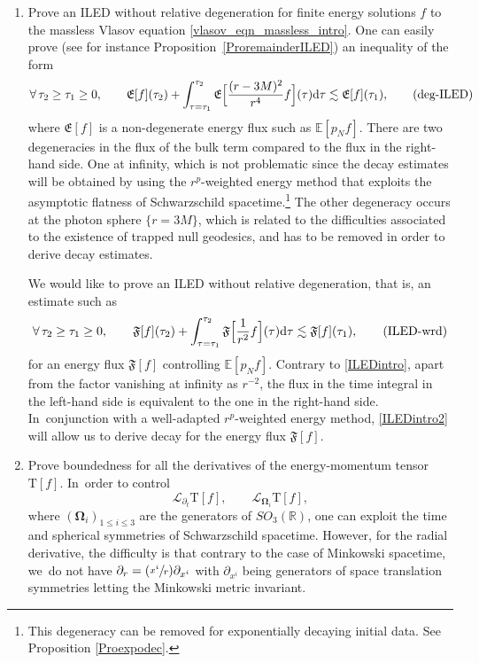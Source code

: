 \documentclass[JEP,XML,SOM,Unicode,published]{cedram}
\newcommand{\Psfrac}[2]{(\sfrac{#1}{#2})}
\theoremstyle{plain}
\theoremstyle{definition}
\newcommand\R{{\mathbb{R}}}
\newcommand\dr{{\mathrm{d}}}
\begin{document}
\begin{enumerate}
\item\label{pb:a} Prove an ILED without relative degeneration for finite energy solutions $f$ to the massless Vlasov equation \eqref{vlasov_eqn_massless_intro}. One can easily prove (see for instance Proposition~\ref{ProremainderILED}) an inequality of the form
\begin{equation}\label{ILEDintro}
\forall \, \tau_2 \geq \tau_1 \geq 0, \qquad \mathfrak{E}[ f](\tau_2)+\int_{\tau = \tau_1}^{\tau_2} \mathfrak{E} \Bigl[ \frac{(r-3M)^2}{r^4} f\Bigr](\tau) \dr \tau \lesssim \mathfrak{E}[ f](\tau_1), \tag{deg-ILED}
\end{equation}
where $\mathfrak{E}[f]$ is a non-degenerate energy flux such as $\mathbb{E}[p_Nf]$. There are two degeneracies in the flux of the bulk term compared to the flux in the right-hand side. One at infinity, which is not problematic since the decay estimates will be obtained by using the $r^p$-weighted energy method that exploits the asymptotic flatness of Schwarzschild spacetime.\footnote{ This degeneracy can be removed for exponentially decaying initial data. See Proposition \ref{Proexpodec}.} The other degeneracy occurs at the photon sphere $\{r=3M\}$, which is related to the difficulties associated to the existence of trapped null geodesics, and has to be removed in order to derive decay estimates.

We would like to prove an ILED without relative degeneration, that is, an estimate such as
\begin{equation}\label{ILEDintro2}
\forall \, \tau_2 \geq \tau_1 \geq 0, \qquad \mathfrak{F}[ f](\tau_2)+\int_{\tau = \tau_1}^{\tau_2} \mathfrak{F} \Bigl[ \frac{1}{r^2} f\Bigr](\tau) \dr \tau \lesssim \mathfrak{F}[ f](\tau_1), \tag{ILED-wrd}
\end{equation}
for an energy flux $\mathfrak{F}[f]$ controlling $\mathbb{E}[p_Nf]$. Contrary to \eqref{ILEDintro}, apart from the factor vanishing at infinity as $r^{-2}$, the flux in the time integral in the left-hand side is equivalent to the one in the right-hand side. In~conjunction with a well-adapted $r^p$-weighted energy method, \eqref{ILEDintro2} will allow us to derive decay for the energy flux $\mathfrak{F}[f]$.

\item\label{pb:b} Prove boundedness for all the derivatives of the energy-momentum tensor $\mathrm{T}[f]$. In~order to control
\[
\mathcal{L}_{\partial_t}\mathrm{T}[f],\qquad \mathcal{L}_{\mathbf{\Omega}_i}\mathrm{T}[f],
\]
where $(\mathbf{\Omega}_i)_{1 \leq i \leq 3}$ are the generators of $SO_3(\R)$, one can exploit the time and spherical symmetries of Schwarzschild spacetime. However, for the radial derivative, the difficulty is that contrary to the case of Minkowski spacetime, we~do not have $\partial_r = \Psfrac{x^i}{r} \partial_{x^i}$ with $\partial_{x^i}$ being generators of space translation symmetries letting the Minkowski metric invariant.


\end{enumerate}
\end{document}
